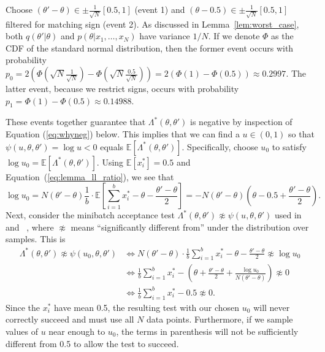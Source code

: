 \documentclass[letterpaper]{article}
\newcommand{\mE}{\mathbb{E}}
\begin{document}
Choose $(\theta' - \theta) \in \pm\frac{1}{\sqrt{N}}[0.5,1]$ (event 1) and
$(\theta -0.5) \in \pm\frac{1}{\sqrt{N}}[0.5,1]$ filtered for  matching sign
(event 2).  As discussed in Lemma~\ref{lem:worst_case}, both $q(\theta' |
\theta)$ and $p(\theta | x_1,\ldots,x_N)$ have variance $1/N$. If we denote
$\Phi$ as the CDF of the standard normal distribution, then the former event
occurs with probability $p_0 = 2(\Phi(\sqrt{N}\frac{1}{\sqrt{N}}) -
\Phi(\sqrt{N}\frac{0.5}{\sqrt{N}})) = 2(\Phi(1)-\Phi(0.5)) \approx 0.2997$. The
latter event, because we restrict signs, occurs with probability $p_1 =
\Phi(1)-\Phi(0.5) \approx 0.14988$. 

These events together guarantee that $\Lambda^*(\theta,\theta')$ is negative by
inspection of Equation (\ref{eq:whyneg}) below.  This implies that we can find a
$u \in (0,1)$ so that $\psi(u,\theta,\theta') = \log u < 0$ equals
$\mE[\Lambda^*(\theta,\theta')]$.  Specifically, choose $u_0$ to satisfy $\log u_0
= \mE[\Lambda^*(\theta,\theta')]$.  Using $\mE[x_i^*] = 0.5$ and
Equation~(\ref{eq:lemma_ll_ratio}), we see that
\begin{equation}\label{eq:whyneg}
    \log u_0 = N(\theta'-\theta)\frac{1}{b} \cdot \mE\left[\sum_{i=1}^b x_i^*-\theta-\frac{\theta'-\theta}{2}\right]
    = -N(\theta'-\theta)\left(\theta-0.5+\frac{\theta'-\theta}{2}\right).
\end{equation}
Next, consider the minibatch acceptance test $\Lambda^*(\theta,\theta')
\not\approx \psi(u,\theta,\theta')$ used in ~\citep{cutting_mh_2014}
and~\citep{icml2014c1_bardenet14} , where $\not\approx$ means ``significantly
different from'' under the distribution over samples. This is
\begin{align}
\Lambda^*(\theta,\theta')  \not\approx \psi(u_0,\theta,\theta') 
&\iff N(\theta'-\theta) \cdot \frac{1}{b}\sum_{i=1}^b x_i^*-\theta-\frac{\theta'-\theta}{2} \not\approx \log u_0\\
&\iff \frac{1}{b}\sum_{i=1}^b x_i^*-\left(\theta+\frac{\theta'-\theta}{2} + \frac{\log u_0}{N(\theta'-\theta)}\right) \not\approx  0 \\
&\iff \frac{1}{b}\sum_{i=1}^b x_i^*-0.5 \not\approx 0. \label{eq:accept_test_zero}
\end{align}
Since the $x_i^*$ have mean 0.5, the resulting test with our chosen $u_0$ will
never correctly succeed and must use all $N$ data points.  Furthermore, if we
sample values of $u$ near enough to $u_0$, the terms in parenthesis will not be
sufficiently different from 0.5 to allow the test to succeed. 
  
\end{document}
